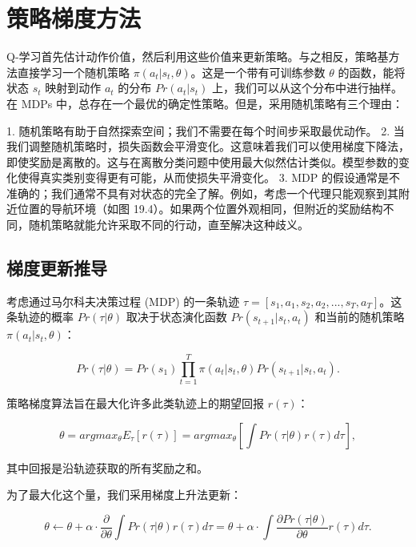 \documentclass[lang=cn,newtx,10pt,scheme=chinese]{elegantbook}
\begin{document}
\section{策略梯度方法}
Q-学习首先估计动作价值，然后利用这些价值来更新策略。与之相反，策略基方法直接学习一个随机策略 \(\pi(a_t|s_t, \theta)\)。这是一个带有可训练参数 \(\theta\) 的函数，能将状态 \(s_t\) 映射到动作 \(a_t\) 的分布 \(Pr(a_t|s_t)\) 上，我们可以从这个分布中进行抽样。在 MDPs 中，总存在一个最优的确定性策略。但是，采用随机策略有三个理由：

1. 随机策略有助于自然探索空间；我们不需要在每个时间步采取最优动作。
2. 当我们调整随机策略时，损失函数会平滑变化。这意味着我们可以使用梯度下降法，即使奖励是离散的。这与在离散分类问题中使用最大似然估计类似。模型参数的变化使得真实类别变得更有可能，从而使损失平滑变化。
3. MDP 的假设通常是不准确的；我们通常不具有对状态的完全了解。例如，考虑一个代理只能观察到其附近位置的导航环境（如图 19.4）。如果两个位置外观相同，但附近的奖励结构不同，随机策略就能允许采取不同的行动，直至解决这种歧义。


\subsection{梯度更新推导}
考虑通过马尔科夫决策过程 (MDP) 的一条轨迹 \(\tau = [s_1, a_1, s_2, a_2, ..., s_T, a_T]\)。这条轨迹的概率 \(Pr(\tau|\theta)\) 取决于状态演化函数 \(Pr(s_{t+1}|s_t, a_t)\) 和当前的随机策略 \(\pi(a_t|s_t, \theta)\)：

\begin{equation}
Pr(\tau|\theta) = Pr(s_1) \prod_{t=1}^{T} \pi(a_t|s_t, \theta)Pr(s_{t+1}|s_t, a_t). 
\end{equation}

策略梯度算法旨在最大化许多此类轨迹上的期望回报 \(r(\tau)\)：

\begin{equation}
\theta = argmax_{\theta} E_{\tau} \left[ r(\tau) \right] = argmax_{\theta} \left[ \int Pr(\tau|\theta)r(\tau) d\tau \right], 
\end{equation}

其中回报是沿轨迹获取的所有奖励之和。

为了最大化这个量，我们采用梯度上升法更新：

\begin{equation}
\theta \leftarrow \theta + \alpha \cdot \frac{\partial}{\partial \theta} \int Pr(\tau|\theta)r(\tau) d\tau
= \theta + \alpha \cdot \int \frac{\partial Pr(\tau|\theta)}{\partial \theta} r(\tau) d\tau. 
\end{equation}
\end{document}
